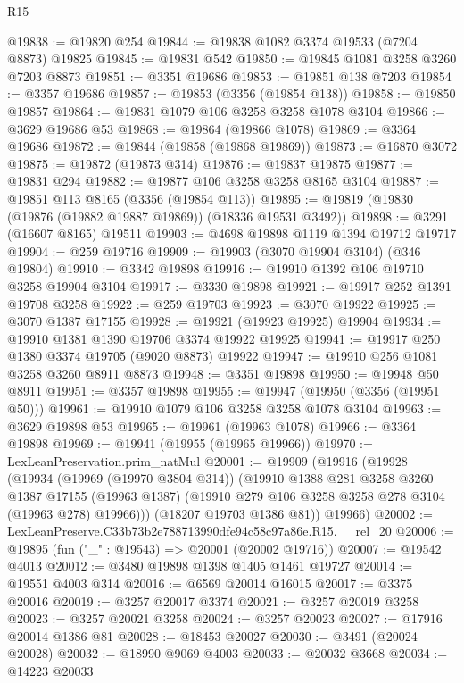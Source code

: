\begin{lexlean}{R15}
\begin{coremodule}
@19838 := @19820 @254
@19844 := @19838 @1082 @3374 @19533 (@7204 @8873) @19825
@19845 := @19831 @542
@19850 := @19845 @1081 @3258 @3260 @7203 @8873
@19851 := @3351 @19686
@19853 := @19851 @138 @7203
@19854 := @3357 @19686
@19857 := @19853 (@3356 (@19854 @138))
@19858 := @19850 @19857
@19864 := @19831 @1079 @106 @3258 @3258 @1078 @3104
@19866 := @3629 @19686 @53
@19868 := @19864 (@19866 @1078)
@19869 := @3364 @19686
@19872 := @19844 (@19858 (@19868 @19869))
@19873 := @16870 @3072
@19875 := @19872 (@19873 @314)
@19876 := @19837 @19875
@19877 := @19831 @294
@19882 := @19877 @106 @3258 @3258 @8165 @3104
@19887 := @19851 @113 @8165 (@3356 (@19854 @113))
@19895 := @19819 (@19830 (@19876 (@19882 @19887 @19869)) (@18336 @19531 @3492))
@19898 := @3291 (@16607 @8165) @19511
@19903 := @4698 @19898 @1119 @1394 @19712 @19717
@19904 := @259 @19716
@19909 := @19903 (@3070 @19904 @3104) (@346 @19804)
@19910 := @3342 @19898
@19916 := @19910 @1392 @106 @19710 @3258 @19904 @3104
@19917 := @3330 @19898
@19921 := @19917 @252 @1391 @19708 @3258
@19922 := @259 @19703
@19923 := @3070 @19922
@19925 := @3070 @1387 @17155
@19928 := @19921 (@19923 @19925) @19904
@19934 := @19910 @1381 @1390 @19706 @3374 @19922 @19925
@19941 := @19917 @250 @1380 @3374 @19705 (@9020 @8873) @19922
@19947 := @19910 @256 @1081 @3258 @3260 @8911 @8873
@19948 := @3351 @19898
@19950 := @19948 @50 @8911
@19951 := @3357 @19898
@19955 := @19947 (@19950 (@3356 (@19951 @50)))
@19961 := @19910 @1079 @106 @3258 @3258 @1078 @3104
@19963 := @3629 @19898 @53
@19965 := @19961 (@19963 @1078)
@19966 := @3364 @19898
@19969 := @19941 (@19955 (@19965 @19966))
@19970 := LexLeanPreservation.prim_natMul
@20001 := @19909
    (@19916
      (@19928
        (@19934
          (@19969 (@19970 @3804 @314))
          (@19910
            @1388
            @281
            @3258
            @3260
            @1387
            @17155
            (@19963 @1387)
            (@19910 @279 @106 @3258 @3258 @278 @3104 (@19963 @278) @19966)))
        (@18207 @19703 @1386 @81))
      @19966)
@20002 := LexLeanPreserve.C33b73b2e788713990dfe94c58c97a86e.R15.__rel_20
@20006 := @19895 (fun ("_" : @19543) => @20001 (@20002 @19716))
@20007 := @19542 @4013
@20012 := @3480 @19898 @1398 @1405 @1461 @19727
@20014 := @19551 @4003 @314
@20016 := @6569 @20014 @16015
@20017 := @3375 @20016
@20019 := @3257 @20017 @3374
@20021 := @3257 @20019 @3258
@20023 := @3257 @20021 @3258
@20024 := @3257 @20023
@20027 := @17916 @20014 @1386 @81
@20028 := @18453 @20027
@20030 := @3491 (@20024 @20028)
@20032 := @18990 @9069 @4003
@20033 := @20032 @3668
@20034 := @14223 @20033

\end{coremodule}
\end{lexlean}
